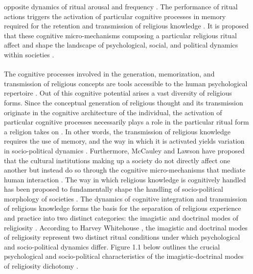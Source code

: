\documentclass[12pt]{report}
\begin{document}
opposite dynamics of ritual arousal and frequency \cite{whitehouse2007}. The performance of ritual actions triggers the activation of particular cognitive processes in memory required for the retention and transmission of religious knowledge \cite{whitehouse2001}\cite{whitehouse2005}. It is proposed that these cognitive micro-mechanisms composing a particular religious ritual affect and shape the landscape of psychological, social, and political dynamics within societies \cite{whitehouse2004modes}.\\
	\\
	The cognitive processes involved in the generation, memorization, and transmission of religious concepts are tools accessible to the human psychological repertoire \cite{boyer2023naturalness}. Out of this cognitive potential arises a vast diversity of religious forms. Since the conceptual generation of religious thought and its transmission originate in the cognitive architecture of the individual, the activation of particular cognitive processes necessarily plays a role in the particular ritual form a religion takes on \cite{boyer1993cognitive}\cite{boyer2023naturalness}\cite{mccauley2002}. In other words, the transmission of religious knowledge requires the use of memory, and the way in which it is activated yields variation in socio-political dynamics \cite{boyer2023naturalness}\cite{whitehouse2002}. Furthermore, McCauley and Lawson \cite{lawson1990} have proposed that the cultural institutions making up a society do not directly affect one another but instead do so through the cognitive micro-mechanisms that mediate human interaction \cite{whitehouse2007}. The way in which religious knowledge is cognitively handled has been proposed to fundamentally shape the handling of socio-political morphology of societies \cite{boyer1993cognitive}\cite{boyer2023naturalness}\cite{hirschfeld1994}\cite{mccauley2002}\cite{sperber1996}\cite{whitehouse2005}\cite{whitehouse2004modes}. The dynamics of cognitive integration and transmission of religious knowledge forms the basis for the separation of religious experience and practice into two distinct categories: the imagistic and doctrinal modes of religiosity \cite{whitehouse2004modes}. According to Harvey Whitehouse \cite{whitehouse1992}\cite{whitehouse2002}\cite{whitehouse1996}\cite{whitehouse2004modes}, the imagistic and doctrinal modes of religiosity represent two distinct ritual conditions under which psychological and socio-political dynamics differ. Figure 1.1 below outlines the crucial psychological and socio-political characteristics of the imagistic-doctrinal modes of religiosity dichotomy \cite{whitehouse2004modes}.\\
	
\end{document}
